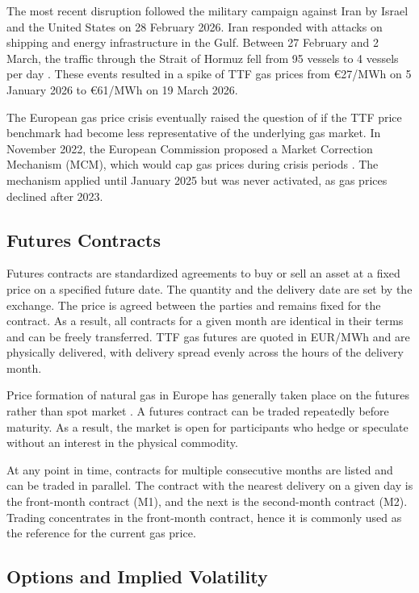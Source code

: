 The most recent disruption followed the military campaign against Iran by Israel and the United States on 28 February 2026. Iran responded with attacks on shipping and energy infrastructure in the Gulf. Between 27 February and 2 March, the traffic through the Strait of Hormuz fell from 95 vessels to 4 vessels per day \parencite{persian-gulf-26}. These events resulted in a spike of TTF gas prices from €27/MWh on 5 January 2026 to €61/MWh on 19 March 2026.

The European gas price crisis eventually raised the question of if the TTF price benchmark had become less representative of the underlying gas market. In November 2022, the European Commission proposed a Market Correction Mechanism (MCM), which would cap gas prices during crisis periods \parencite{MCM-euro-commision}. The mechanism applied until January 2025 but was never activated, as gas prices declined after 2023.

\subsection{Futures Contracts}\label{sec:futures}
Futures contracts are standardized agreements to buy or sell an asset at
a fixed price on a specified future date. 
The quantity and the delivery date are set by the exchange. The price is agreed between the parties and remains fixed for the contract. As a result, all contracts for a given month are identical in their terms and can be freely transferred. TTF gas futures are quoted in EUR/MWh and are physically delivered, with delivery spread evenly across the hours of the delivery month. 

Price formation of natural gas in Europe has generally taken place on the futures rather than spot market \parencite{obadiDRIVINGFUNDAMENTALSNATURAL2020}. A futures contract can be traded repeatedly before maturity. As a result, the market is open for participants who hedge or speculate without an interest in the physical commodity.

At any point in time, contracts for multiple consecutive months are listed and can be traded in parallel. The contract with the nearest delivery on a given day is the front-month contract (M1), and the next is the second-month contract (M2). Trading concentrates in the front-month contract, hence it is commonly used as the reference for the current gas price.

\subsection{Options and Implied Volatility}\label{sec:options}



